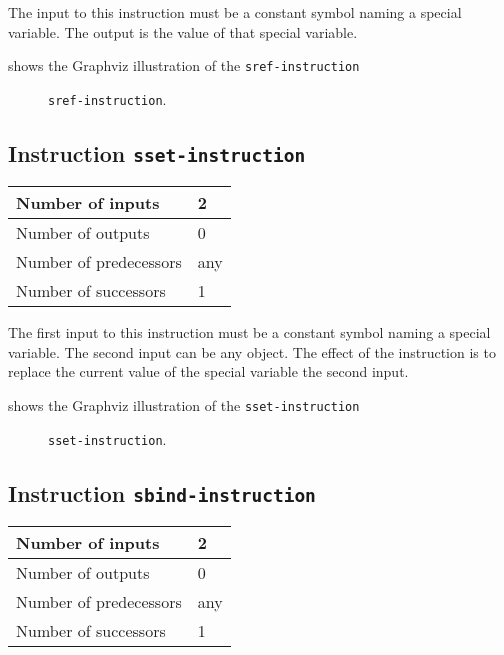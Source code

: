 The input to this instruction must be a constant symbol naming a
special variable.  The output is the value of that special variable.

 shows the Graphviz illustration of the
\texttt{sref-instruction}

\begin{figure}
\begin{center}
\end{center}
\caption{\label{fig-sref-instruction}
\texttt{sref-instruction}.}
\end{figure}

\subsection{Instruction \texttt{sset-instruction}}
\label{mir-instruction-sset}

\begin{tabular}{|l|l|}
\hline
Number of inputs & 2\\
\hline
Number of outputs & 0\\
\hline
Number of predecessors & any\\
\hline
Number of successors & 1\\
\hline
\end{tabular}

The first input to this instruction must be a constant symbol naming a
special variable.  The second input can be any object.  The effect of
the instruction is to replace the current value of the special
variable the second input.

 shows the Graphviz illustration of the
\texttt{sset-instruction}

\begin{figure}
\begin{center}
\end{center}
\caption{\label{fig-sset-instruction}
\texttt{sset-instruction}.}
\end{figure}

\subsection{Instruction \texttt{sbind-instruction}}
\label{mir-instruction-sbind}

\begin{tabular}{|l|l|}
\hline
Number of inputs & 2\\
\hline
Number of outputs & 0\\
\hline
Number of predecessors & any\\
\hline
Number of successors & 1\\
\hline
\end{tabular}


